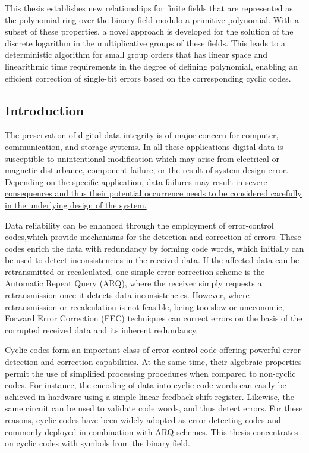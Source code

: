 \documentclass[a4paper, 11pt]{article}
\begin{document}
This thesis establishes new relationships for finite fields that are represented as the polynomial ring over the binary field modulo a primitive polynomial. With a subset of these properties, a novel approach is developed for the solution of the discrete logarithm in the multiplicative groups of these fields. This leads to a deterministic algorithm for small group orders that has linear space and linearithmic time requirements in the degree of defining polynomial, enabling an efficient correction of single-bit errors based on the corresponding cyclic codes.

\subsection{Introduction}
\ul{The preservation of digital data integrity is of major concern for computer, communication, and storage systems. In all these applications digital data is susceptible to unintentional modification which may arise from electrical or magnetic disturbance, component failure, or the result of system design error. Depending on the specific application, data failures may result in severe consequences and thus their potential occurrence needs to be considered carefully in the underlying design of the system.}

Data reliability can be enhanced through the employment of error-control codes,which provide mechanisms for the detection and correction of errors. These codes enrich the data with redundancy by forming code words, which initially can be used to detect inconsistencies in the received data. If the affected data can be retransmitted or recalculated, one simple error correction scheme is the Automatic Repeat Query (ARQ), where the receiver simply requests a retransmission once it detects data inconsistencies. However, where retransmission or recalculation is not feasible, being too slow or uneconomic, Forward Error Correction (FEC) techniques can correct errors on the basis of the corrupted received data and its inherent redundancy.

Cyclic codes form an important class of error-control code offering powerful error detection and correction capabilities. At the same time, their algebraic properties permit the use of simplified processing procedures when compared to non-cyclic codes. For instance, the encoding of data into cyclic code words can easily be achieved in hardware using a simple linear feedback shift register. Likewise, the same circuit can be used to validate code words, and thus detect errors. For these reasons, cyclic codes have been widely adopted as error-detecting codes and commonly deployed in combination with ARQ schemes. This thesis concentrates on cyclic codes with symbols from the binary field.
\end{document}
